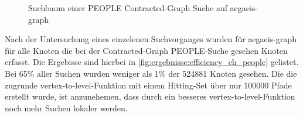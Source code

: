 \begin{figure}[h!]
  \caption{Suchbaum einer PEOPLE Contracted-Graph Suche auf aegaeis-graph}
  \label{fig:ergebnisse:ch_people_suchbaum}
\end{figure}

Nach der Untersuchung eines einzelenen Suchvorganges wurden für aegaeis-graph für alle Knoten die bei der Contracted-Graph PEOPLE-Suche gesehen Knoten erfasst.
Die Ergebisse sind hierbei in \autoref{fig:ergebnisse:efficiency_ch_people} gelistet.
Bei \num{65}\% aller Suchen wurden weniger als \num{1}\% der \num{524881} Knoten gesehen.
Die die zugrunde vertex-to-level-Funktion mit einem Hitting-Set über nur \num{100000} Pfade erstellt wurde, ist anzunehemen, dass durch ein besseres vertex-to-level-Funktion noch mehr Suchen lokaler werden.

